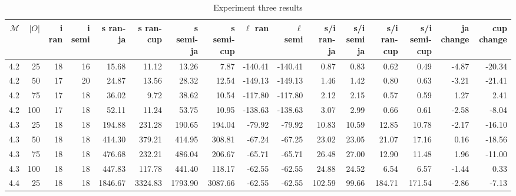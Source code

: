 \begin{table*}[htb!]
    \caption{Experiment three results}
    \label{tab:experiment3-table}
    \begin{tabular}{rrrrrrrrrrrrrrrr}
        \toprule
        $\mathcal{M}$ & $|O|$ & i ran & i semi & s ran-ja & s ran-cup & s semi-ja & s semi-cup & $\ell$ ran & $\ell$ semi & s/i ran-ja & s/i semi ja & s/i ran-cup & s/i semi-cup & ja change & cup change \\
        \midrule
        4.2           & 25    & 18    & 16     & 15.68    & 11.12     & 13.26     & 7.87       & -140.41    & -140.41     & 0.87       & 0.83        & 0.62        & 0.49         & -4.87     & -20.34     \\
        4.2           & 50    & 17    & 20     & 24.87    & 13.56     & 28.32     & 12.54      & -149.13    & -149.13     & 1.46       & 1.42        & 0.80        & 0.63         & -3.21     & -21.41     \\
        4.2           & 75    & 17    & 18     & 36.02    & 9.72      & 38.62     & 10.54      & -117.80    & -117.80     & 2.12       & 2.15        & 0.57        & 0.59         & 1.27      & 2.41       \\
        4.2           & 100   & 17    & 18     & 52.11    & 11.24     & 53.75     & 10.95      & -138.63    & -138.63     & 3.07       & 2.99        & 0.66        & 0.61         & -2.58     & -8.04      \\
        4.3           & 25    & 18    & 18     & 194.88   & 231.28    & 190.65    & 194.04     & -79.92     & -79.92      & 10.83      & 10.59       & 12.85       & 10.78        & -2.17     & -16.10     \\
        4.3           & 50    & 18    & 18     & 414.30   & 379.21    & 414.95    & 308.81     & -67.24     & -67.25      & 23.02      & 23.05       & 21.07       & 17.16        & 0.16      & -18.56     \\
        4.3           & 75    & 18    & 18     & 476.68   & 232.21    & 486.04    & 206.67     & -65.71     & -65.71      & 26.48      & 27.00       & 12.90       & 11.48        & 1.96      & -11.00     \\
        4.3           & 100   & 18    & 18     & 447.83   & 117.78    & 441.40    & 118.17     & -62.55     & -62.55      & 24.88      & 24.52       & 6.54        & 6.57         & -1.44     & 0.33       \\
        4.4           & 25    & 18    & 18     & 1846.67  & 3324.83   & 1793.90   & 3087.66    & -62.55     & -62.55      & 102.59     & 99.66       & 184.71      & 171.54       & -2.86     & -7.13      \\

\end{tabular}
\end{table*}
